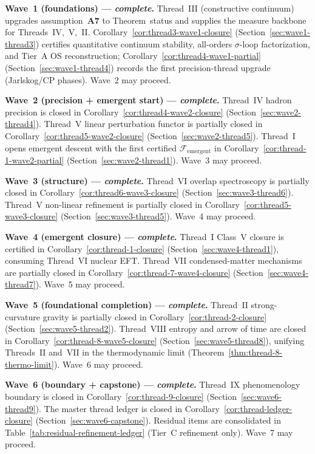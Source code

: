 \medskip
\noindent\textbf{Wave~1 (foundations) --- \emph{complete}.}
Thread~III (constructive continuum) upgrades assumption~\textbf{A7} to
Theorem~status and supplies the measure backbone for Threads~IV,~V,~II.
Corollary~\ref{cor:thread3-wave1-closure} (Section~\ref{sec:wave1-thread3})
certifies quantitative continuum stability, all-orders $\sigma$-loop
factorization, and Tier~A OS reconstruction; Corollary~\ref{cor:thread4-wave1-partial}
(Section~\ref{sec:wave1-thread4}) records the first precision-thread upgrade
(Jarlskog/CP phases). Wave~2 may proceed.

\medskip
\noindent\textbf{Wave~2 (precision + emergent start) --- \emph{complete}.}
Thread~IV hadron precision is closed in
Corollary~\ref{cor:thread4-wave2-closure}
(Section~\ref{sec:wave2-thread4}).
Thread~V linear perturbation functor is partially closed in
Corollary~\ref{cor:thread5-wave2-closure}
(Section~\ref{sec:wave2-thread5}).
Thread~I opens emergent descent with the first certified
$\mathcal{F}_{\mathrm{emergent}}$ in
Corollary~\ref{cor:thread-1-wave2-partial}
(Section~\ref{sec:wave2-thread1}).
Wave~3 may proceed.

\medskip
\noindent\textbf{Wave~3 (structure) --- \emph{complete}.}
Thread~VI overlap spectroscopy is partially closed in
Corollary~\ref{cor:thread6-wave3-closure}
(Section~\ref{sec:wave3-thread6}).
Thread~V non-linear refinement is partially closed in
Corollary~\ref{cor:thread5-wave3-closure}
(Section~\ref{sec:wave3-thread5}).
Wave~4 may proceed.

\medskip
\noindent\textbf{Wave~4 (emergent closure) --- \emph{complete}.}
Thread~I Class~V closure is certified in
Corollary~\ref{cor:thread-1-closure}
(Section~\ref{sec:wave4-thread1}), consuming Thread~VI nuclear EFT.
Thread~VII condensed-matter mechanisms are partially closed in
Corollary~\ref{cor:thread-7-wave4-closure}
(Section~\ref{sec:wave4-thread7}).
Wave~5 may proceed.

\medskip
\noindent\textbf{Wave~5 (foundational completion) --- \emph{complete}.}
Thread~II strong-curvature gravity is partially closed in
Corollary~\ref{cor:thread-2-closure}
(Section~\ref{sec:wave5-thread2}).
Thread~VIII entropy and arrow of time are closed in
Corollary~\ref{cor:thread-8-wave5-closure}
(Section~\ref{sec:wave5-thread8}), unifying Threads~II and~VII in the
thermodynamic limit (Theorem~\ref{thm:thread-8-thermo-limit}).
Wave~6 may proceed.

\medskip
\noindent\textbf{Wave~6 (boundary + capstone) --- \emph{complete}.}
Thread~IX phenomenology boundary is closed in
Corollary~\ref{cor:thread-9-closure}
(Section~\ref{sec:wave6-thread9}).
The master thread ledger is closed in
Corollary~\ref{cor:thread-ledger-closure}
(Section~\ref{sec:wave6-capstone}).
Residual items are consolidated in
Table~\ref{tab:residual-refinement-ledger} (Tier~C refinement only).
Wave~7 may proceed.

